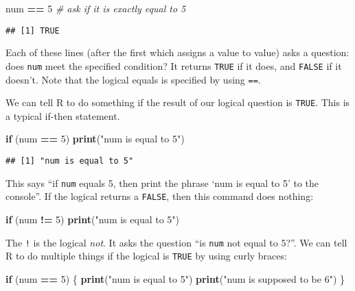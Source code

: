 \documentclass[]{book}
\newenvironment{Shaded}{\begin{snugshade}}{\end{snugshade}}
\newcommand{\KeywordTok}[1]{\textcolor[rgb]{0.13,0.29,0.53}{\textbf{#1}}}
\newcommand{\DecValTok}[1]{\textcolor[rgb]{0.00,0.00,0.81}{#1}}
\newcommand{\StringTok}[1]{\textcolor[rgb]{0.31,0.60,0.02}{#1}}
\newcommand{\CommentTok}[1]{\textcolor[rgb]{0.56,0.35,0.01}{\textit{#1}}}
\newcommand{\ControlFlowTok}[1]{\textcolor[rgb]{0.13,0.29,0.53}{\textbf{#1}}}
\newcommand{\OperatorTok}[1]{\textcolor[rgb]{0.81,0.36,0.00}{\textbf{#1}}}
\newcommand{\NormalTok}[1]{#1}
\theoremstyle{definition}
\theoremstyle{definition}
\theoremstyle{definition}
\theoremstyle{remark}
\begin{document}
\begin{Shaded}
\begin{Highlighting}[]
\NormalTok{num }\OperatorTok{==}\StringTok{ }\DecValTok{5}  \CommentTok{# ask if it is exactly equal to 5}
\end{Highlighting}
\end{Shaded}

\begin{verbatim}
## [1] TRUE
\end{verbatim}

Each of these lines (after the first which assigns a value to value)
asks a question: does \texttt{num} meet the specified condition? It
returns \texttt{TRUE} if it does, and \texttt{FALSE} if it doesn't. Note
that the logical equals is specified by using \texttt{==}.

We can tell R to do something if the result of our logical question is
\texttt{TRUE}. This is a typical if-then statement.

\begin{Shaded}
\begin{Highlighting}[]
\ControlFlowTok{if}\NormalTok{ (num }\OperatorTok{==}\StringTok{ }\DecValTok{5}\NormalTok{) }\KeywordTok{print}\NormalTok{(}\StringTok{"num is equal to 5"}\NormalTok{)}
\end{Highlighting}
\end{Shaded}

\begin{verbatim}
## [1] "num is equal to 5"
\end{verbatim}

This says ``if \texttt{num} equals 5, then print the phrase `num is
equal to 5' to the console''. If the logical returns a \texttt{FALSE},
then this command does nothing:

\begin{Shaded}
\begin{Highlighting}[]
\ControlFlowTok{if}\NormalTok{ (num }\OperatorTok{!=}\StringTok{ }\DecValTok{5}\NormalTok{) }\KeywordTok{print}\NormalTok{(}\StringTok{"num is equal to 5"}\NormalTok{)}
\end{Highlighting}
\end{Shaded}

The \texttt{!} is the logical \emph{not}. It asks the question ``is
\texttt{num} not equal to 5?''. We can tell R to do multiple things if
the logical is \texttt{TRUE} by using curly braces:

\begin{Shaded}
\begin{Highlighting}[]
\ControlFlowTok{if}\NormalTok{ (num }\OperatorTok{==}\StringTok{ }\DecValTok{5}\NormalTok{) \{}
  \KeywordTok{print}\NormalTok{(}\StringTok{"num is equal to 5"}\NormalTok{)}
  \KeywordTok{print}\NormalTok{(}\StringTok{"num is supposed to be 6"}\NormalTok{)}
\NormalTok{\}}
\end{Highlighting}
\end{Shaded}
\end{document}
